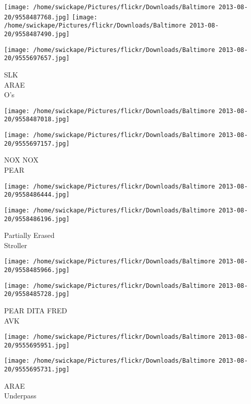 \documentclass[10pt,letterpaper]{article}
\begin{document}
\texttt{[image: /home/swickape/Pictures/flickr/Downloads/Baltimore 2013-08-20/9558487768.jpg]}
\texttt{[image: /home/swickape/Pictures/flickr/Downloads/Baltimore 2013-08-20/9558487490.jpg]}

\texttt{[image: /home/swickape/Pictures/flickr/Downloads/Baltimore 2013-08-20/9555697657.jpg]}

SLK\\
ARAE\\
O's\\
\pagebreak

\texttt{[image: /home/swickape/Pictures/flickr/Downloads/Baltimore 2013-08-20/9558487018.jpg]}

\vspace{0.25in}
\texttt{[image: /home/swickape/Pictures/flickr/Downloads/Baltimore 2013-08-20/9555697157.jpg]}

NOX NOX\\
PEAR\\
\pagebreak

\texttt{[image: /home/swickape/Pictures/flickr/Downloads/Baltimore 2013-08-20/9558486444.jpg]}

\vspace{0.25in}
\texttt{[image: /home/swickape/Pictures/flickr/Downloads/Baltimore 2013-08-20/9558486196.jpg]}

Partially Erased\\
Stroller\\
\pagebreak

\texttt{[image: /home/swickape/Pictures/flickr/Downloads/Baltimore 2013-08-20/9558485966.jpg]}

\vspace{0.25in}
\texttt{[image: /home/swickape/Pictures/flickr/Downloads/Baltimore 2013-08-20/9558485728.jpg]}

PEAR DITA FRED\\
AVK\\
\pagebreak

\texttt{[image: /home/swickape/Pictures/flickr/Downloads/Baltimore 2013-08-20/9555695951.jpg]}

\vspace{0.25in}
\texttt{[image: /home/swickape/Pictures/flickr/Downloads/Baltimore 2013-08-20/9555695731.jpg]}

ARAE\\
Underpass\\
\pagebreak
\end{document}

